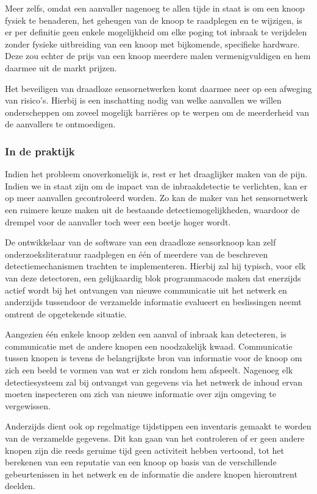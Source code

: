 \documentclass[DIV=calc,paper=a4,fontsize=11pt,twocolumn]{scrartcl}
\newcommand{\heading}[1]{
\vspace{-5mm}
\subsubsection*{#1}
\vspace{-2mm}
}
\begin{document}
Meer zelfs, omdat een aanvaller nagenoeg te allen tijde in staat is om een
knoop fysiek te benaderen, het geheugen van de knoop te raadplegen en te
wijzigen, is er per definitie geen enkele mogelijkheid om elke poging tot
inbraak te verijdelen zonder fysieke uitbreiding van een knoop met bijkomende,
specifieke hardware. Deze zou echter de prijs van een knoop meerdere malen
vermenigvuldigen en hem daarmee uit de markt prijzen.

Het beveiligen van draadloze sensornetwerken komt daarmee neer op een afweging
van risico's. Hierbij is een inschatting nodig van welke aanvallen we willen
onderscheppen om zoveel mogelijk barri\`eres op te werpen om de meerderheid van
de aanvallers te ontmoedigen.

\heading{In de praktijk}

Indien het probleem onoverkomelijk is, rest er het draaglijker maken van de
pijn. Indien we in staat zijn om de impact van de inbraakdetectie te
verlichten, kan er op meer aanvallen gecontroleerd worden. Zo kan de maker van
het sensornetwerk een ruimere keuze maken uit de bestaande
detectiemogelijkheden, waardoor de drempel voor de aanvaller toch weer een
beetje hoger wordt.

De ontwikkelaar van de software van een draadloze sensorknoop kan zelf
onderzoeksliteratuur raadplegen en \'e\'en of meerdere van de beschreven
detectiemechanismen trachten te implementeren. Hierbij zal hij typisch, voor
elk van deze detectoren, een gelijkaardig blok programmacode maken dat
enerzijds actief wordt bij het ontvangen van nieuwe communicatie uit het
netwerk en anderzijds tussendoor de verzamelde informatie evalueert en
beslissingen neemt omtrent de opgetekende situatie.

Aangezien \'e\'en enkele knoop zelden een aanval of inbraak kan detecteren, is
communicatie met de andere knopen een noodzakelijk kwaad. Communicatie tussen
knopen is tevens de belangrijkste bron van informatie voor de knoop om zich een
beeld te vormen van wat er zich rondom hem afspeelt. Nagenoeg elk
detectiesysteem zal bij ontvangst van gegevens via het netwerk de inhoud ervan
moeten inspecteren om zich van nieuwe informatie over zijn omgeving te
vergewissen.

Anderzijds dient ook op regelmatige tijdstippen een inventaris gemaakt te
worden van de verzamelde gegevens. Dit kan gaan van het controleren of er geen
andere knopen zijn die reeds geruime tijd geen activiteit hebben vertoond, tot
het berekenen van een reputatie van een knoop op basis van de verschillende
gebeurtenissen in het netwerk en de informatie die andere knopen hieromtrent
deelden.
\end{document}
